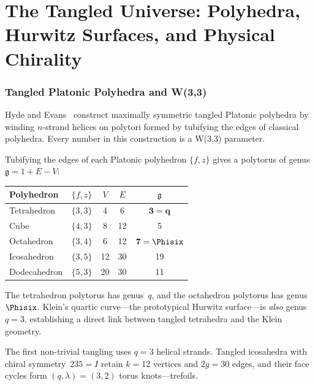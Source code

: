 \clearpage
\part{The Tangled Universe: Polyhedra, Hurwitz Surfaces, and Physical Chirality}

\section{Tangled Platonic Polyhedra and W(3,3)}
\label{sec:tangled}

Hyde and Evans~\cite{HydeEvans2022} construct maximally symmetric
tangled Platonic polyhedra by winding $n$-strand helices on polytori
formed by tubifying the edges of classical polyhedra.
Every number in this construction is a W(3,3) parameter.

\begin{theorem}[Polytorus Genus = W(3,3) Parameters]
Tubifying the edges of each Platonic polyhedron $\{f,z\}$ gives
a polytorus of genus $\mathfrak{g}=1+E-V$:
\begin{center}
\begin{tabular}{@{}lcccc@{}}
\toprule
Polyhedron & $\{f,z\}$ & $V$ & $E$ & $\mathfrak{g}$ \\
\midrule
Tetrahedron & $\{3,3\}$ & 4 & 6 & $\mathbf{3=q}$ \\
Cube & $\{4,3\}$ & 8 & 12 & 5 \\
Octahedron & $\{3,4\}$ & 6 & 12 & $\mathbf{7=\Phisix}$ \\
Icosahedron & $\{3,5\}$ & 12 & 30 & 19 \\
Dodecahedron & $\{5,3\}$ & 20 & 30 & 11 \\
\bottomrule
\end{tabular}
\end{center}
\end{theorem}

The tetrahedron polytorus has genus~$q$,
and the octahedron polytorus has genus~$\Phisix$.
Klein's quartic curve---the prototypical Hurwitz surface---is
\emph{also} genus~$q=3$, establishing a direct link between
tangled tetrahedra and the Klein geometry.

The first non-trivial tangling uses $q=3$ helical strands.
Tangled icosahedra with chiral symmetry~$235=I$ retain
$k=12$ vertices and $2g=30$ edges, and their face cycles
form $(q,\lambda)=(3,2)$ torus knots---trefoils.


